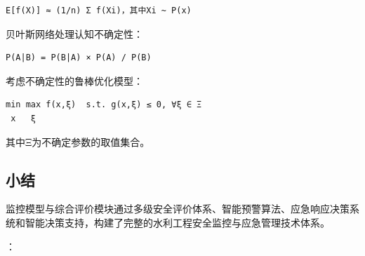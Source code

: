 \begin{lstlisting}
E[f(X)] ≈ (1/n) Σ f(Xi)，其中Xi ~ P(x)
\end{lstlisting}

贝叶斯网络处理认知不确定性：

\begin{lstlisting}
P(A|B) = P(B|A) × P(A) / P(B)
\end{lstlisting}


考虑不确定性的鲁棒优化模型：

\begin{lstlisting}
min max f(x,ξ)  s.t. g(x,ξ) ≤ 0, ∀ξ ∈ Ξ
 x   ξ
\end{lstlisting}

其中Ξ为不确定参数的取值集合。

\hypertarget{ux5c0fux7ed3-1}{%
\subsection{小结}\label{ux5c0fux7ed3-1}}

监控模型与综合评价模块通过多级安全评价体系、智能预警算法、应急响应决策系统和智能决策支持，构建了完整的水利工程安全监控与应急管理技术体系。

：

